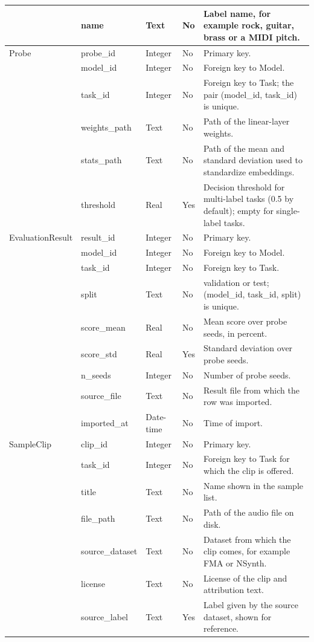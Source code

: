 \documentclass{FastFyp}
\begin{document}
{\begin{longtable}{P{2.8cm}P{2.6cm}P{1.6cm}P{1.4cm}P{5.35cm}}
 & name & Text & No & Label name, for example rock, guitar, brass or a MIDI pitch.\\
\midrule
Probe & probe\_id & Integer & No & Primary key.\\
 & model\_id & Integer & No & Foreign key to Model.\\
 & task\_id & Integer & No & Foreign key to Task; the pair (model\_id, task\_id) is unique.\\
 & weights\_path & Text & No & Path of the linear-layer weights.\\
 & stats\_path & Text & No & Path of the mean and standard deviation used to standardize embeddings.\\
 & threshold & Real & Yes & Decision threshold for multi-label tasks (0.5 by default); empty for single-label tasks.\\
\midrule
EvaluationResult & result\_id & Integer & No & Primary key.\\
 & model\_id & Integer & No & Foreign key to Model.\\
 & task\_id & Integer & No & Foreign key to Task.\\
 & split & Text & No & validation or test; (model\_id, task\_id, split) is unique.\\
 & score\_mean & Real & No & Mean score over probe seeds, in percent.\\
 & score\_std & Real & Yes & Standard deviation over probe seeds.\\
 & n\_seeds & Integer & No & Number of probe seeds.\\
 & source\_file & Text & No & Result file from which the row was imported.\\
 & imported\_at & Date-time & No & Time of import.\\
\midrule
SampleClip & clip\_id & Integer & No & Primary key.\\
 & task\_id & Integer & No & Foreign key to Task for which the clip is offered.\\
 & title & Text & No & Name shown in the sample list.\\
 & file\_path & Text & No & Path of the audio file on disk.\\
 & source\_dataset & Text & No & Dataset from which the clip comes, for example FMA or NSynth.\\
 & license & Text & No & License of the clip and attribution text.\\
 & source\_label & Text & Yes & Label given by the source dataset, shown for reference.\\

\end{longtable}}
\end{document}
